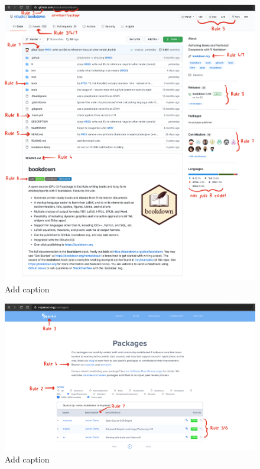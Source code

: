 \documentclass[10pt,letterpaper]{article}
\begin{document}
\begin{figure}
\includegraphics[width=1\linewidth]{../figures/github_bookdown} \caption{Add caption}\label{fig:github_bookdown}
\end{figure}

\begin{figure}
\includegraphics[width=1\linewidth]{../figures/ropensci_imgproc} \caption{Add caption}\label{fig:ropensci_imgproc}
\end{figure}
\end{document}

